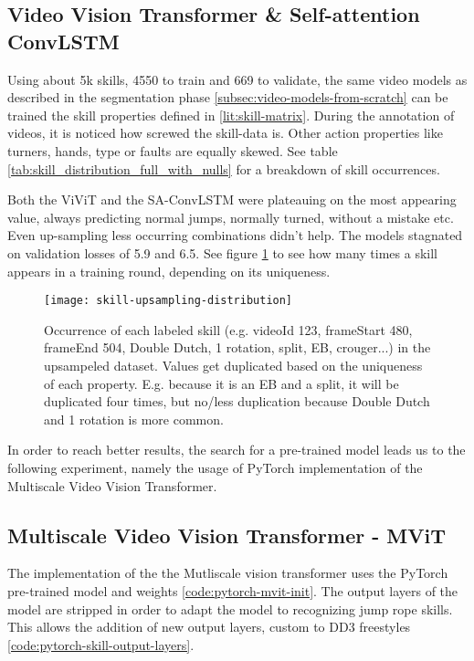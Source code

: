 \subsection{Video Vision Transformer \& Self-attention ConvLSTM}

Using about 5k skills, 4550 to train and 669 to validate, the same video models as described in the segmentation phase \ref{subsec:video-models-from-scratch} can be trained the skill properties defined in \ref{lit:skill-matrix}.
During the annotation of videos, it is noticed how screwed the skill-data is. Other action properties like turners, hands, type or faults are equally skewed. See table \ref{tab:skill_distribution_full_with_nulls} for a breakdown of skill occurrences.

Both the ViViT and the SA-ConvLSTM were plateauing on the most appearing value, always predicting normal jumps, normally turned, without a mistake etc.
Even up-sampling less occurring combinations didn't help. The models stagnated on validation losses of 5.9 and 6.5. See figure \ref{fig:skill-upsampling-distribution} to see how many times a skill appears in a training round, depending on its uniqueness.

\begin{figure}
    \centering
    \texttt{[image: skill-upsampling-distribution]}
    \caption[upsampling distribution of skills]{Occurrence of each labeled skill (e.g. videoId 123, frameStart 480, frameEnd 504, Double Dutch, 1 rotation, split, EB, crouger...) in the upsampeled dataset. Values get duplicated based on the uniqueness of each property. E.g. because it is an EB and a split, it will be duplicated four times, but no/less duplication because Double Dutch and 1 rotation is more common.}
    \label{fig:skill-upsampling-distribution}
\end{figure}

In order to reach better results, the search for a pre-trained model leads us to the following experiment, namely the usage of PyTorch implementation of the Multiscale Video Vision Transformer.

\subsection{Multiscale Video Vision Transformer - MViT}
\label{results:mvit}

The implementation of the the Mutliscale vision transformer uses the PyTorch pre-trained model and weights \ref{code:pytorch-mvit-init}.
The output layers of the model are stripped in order to adapt the model to recognizing jump rope skills. This allows the addition of new output layers, custom to DD3 freestyles \ref{code:pytorch-skill-output-layers}.

